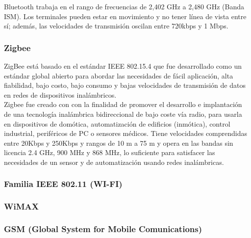 	Bluetooth trabaja en el rango de frecuencias de 2,402 GHz a 2,480 GHz (Banda ISM). Los terminales pueden estar en movimiento y no tener línea de vista entre sí; además, las velocidades de transmisión oscilan entre 720kbps y 1 Mbps. 
	
	\subsubsection{Zigbee}
	ZigBee está basado en el estándar IEEE 802.15.4 que fue desarrollado como un estándar global abierto para abordar las necesidades de fácil aplicación, alta fiabilidad, bajo costo, bajo consumo y bajas velocidades de transmisión de datos en redes de dispositivos inalámbricos.\\
		
	Zigbee fue creado con  con la finalidad de promover el desarrollo e implantación de una tecnología inalámbrica bidireccional de bajo coste vía radio, para usarla en dispositivos de domótica, automatización de edificios (inmótica), control industrial, periféricos de PC o sensores médicos.  Tiene velocidades comprendidas entre 20Kbps y 250Kbps y rangos de 10 m a 75 m y opera en las bandas sin licencia 2.4 GHz, 900 MHz y 868 MHz, lo suficiente para satisfacer las necesidades de un sensor y de automatización usando redes inalámbricas.
	
	\subsubsection{Familia IEEE 802.11 (WI-FI)}
	
	
	\subsubsection{WiMAX}
	
	\subsubsection{GSM (Global System for Mobile Comunications)}
	
	